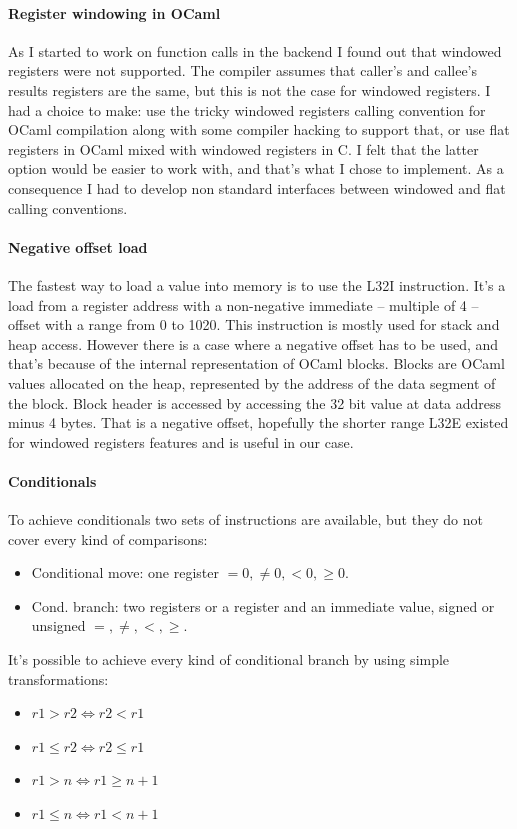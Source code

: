 \documentclass[a4paper]{article}
\begin{document}
\paragraph{Register windowing in OCaml}
As I started to work on function calls in the backend I found out that windowed registers were not supported. The compiler assumes that caller's and callee's results registers are the same, but this is not the case for windowed registers. I had a choice to make: use the tricky windowed registers calling convention for OCaml compilation along with some compiler hacking to support that, or use flat registers in OCaml mixed with windowed registers in C. I felt that the latter option would be easier to work with, and that's what I chose to implement. As a consequence I had to develop non standard interfaces between windowed and flat calling conventions. 

\paragraph{Negative offset load}
The fastest way to load a value into memory is to use the L32I instruction. It's a load from a register address with a non-negative immediate -- multiple of 4 -- offset with a range from 0 to 1020. This instruction is mostly used for stack and heap access. However there is a case where a negative offset has to be used, and that's because of the internal representation of OCaml blocks. Blocks are OCaml values allocated on the heap, represented by the address of the data segment of the block. Block header is accessed by accessing the 32 bit value at data address minus 4 bytes. 
That is a negative offset, hopefully the shorter range L32E existed for windowed registers features and is useful in our case. 

\paragraph{Conditionals}
To achieve conditionals two sets of instructions are available, but they do not cover every kind of comparisons:
\begin{itemize}[itemsep=0pt,parsep=0pt]
    \item Conditional move: one register $= 0, \neq 0, < 0, \geq 0$.
    \item Cond. branch: two registers or a register and an immediate value, signed or unsigned $=, \neq, <, \geq$.
\end{itemize}
It's possible to achieve every kind of conditional branch by using simple transformations:
\begin{itemize}[itemsep=0pt,parsep=0pt]
\item $r1 > r2 \iff r2 < r1$ 
\item $r1 \leq r2 \iff r2 \leq r1$
\item $r1 > n \iff r1 \geq n+1$ 
\item $r1 \leq n \iff r1 < n+1$
\end{itemize}
\end{document}
